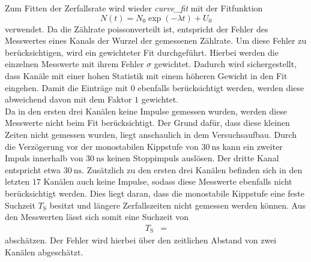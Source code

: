 Zum Fitten der Zerfallsrate wird wieder \emph{curve\_fit} mit der Fitfunktion
\begin{equation}
  N(t) = N_0 \exp{(-\lambda t)} + U_0 \label{exp}
\end{equation}
verwendet.
Da die Zählrate poissonverteilt ist, entspricht der Fehler des Messwertes eines Kanals der Wurzel der gemessenen Zählrate.
Um diese Fehler zu berücksichtigen, wird ein gewichteter Fit durchgeführt.
Hierbei werden die einzelnen Messwerte mit ihrem Fehler $\sigma$ gewichtet.
Dadurch wird sichergestellt, dass Kanäle mit einer hohen Statistik mit einem höheren Gewicht in den Fit eingehen.
Damit die Einträge mit $\num{0}$ ebenfalls berücksichtigt werden, werden diese abweichend davon mit dem Faktor $\num{1}$ gewichtet.\\
Da in den ersten drei Kanälen keine Impulse gemessen wurden, werden diese Messwerte nicht beim Fit berücksichtigt.
Der Grund dafür, dass diese kleinen Zeiten nicht gemessen wurden, liegt anschaulich in dem Versuchsaufbau.
Durch die Verzögerung vor der monostabilen Kippstufe von $\SI{30}{\nano\second}$ kann ein zweiter Impuls innerhalb von $\SI{30}{\nano\second}$ keinen Stoppimpuls auslösen.
Der dritte Kanal entspricht etwa $\SI{30}{\nano\second}$.
Zusätzlich zu den ersten drei Kanälen befinden sich in den letzten $\num{17}$ Kanälen auch keine Impulse, sodass diese Messwerte ebenfalls nicht berücksichtigt werden.
Dies liegt daran, dass die monostabile Kippstufe eine feste Suchzeit $T_\text{S}$ besitzt und längere Zerfallszeiten nicht gemessen werden können.
Aus den Messwerten lässt sich somit eine Suchzeit von
\begin{align*}
  T_\text{S} &= 
\end{align*}
abschätzen.
Der Fehler wird hierbei über den zeitlichen Abstand von zwei Kanälen abgeschätzt.


